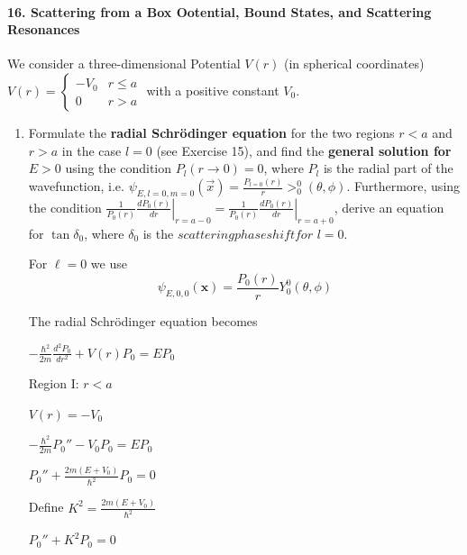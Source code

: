 \documentclass[11pt,a4paper]{scrartcl}
\begin{document}
    \paragraph{16. Scattering from a Box Ootential, Bound States, and Scattering Resonances} We consider a three-dimensional Potential $V(r)$ (in spherical coordinates) 
    $V(r) = \begin{cases}
        -V_0 & r \leq a\\ 0 & r > a
    \end{cases}$
    with a positive constant $V_0$.

    \begin{enumerate}
        \item 
            Formulate the \textbf{radial Schrödinger equation} for the two regions $r < a$ and $r > a$ in the case $l = 0$ (see Exercise 15), and find the \textbf{general solution for} $E > 0$ using the condition $P_l(r \to 0) = 0$, where $P_l$ is the radial part of the wavefunction, i.e. $\psi_{E,l = 0, m = 0}(\vec{x}) = \frac{P_{l = 0}(r)}{r} >_0^0(\theta, \phi)$. Furthermore, using the condition $\left.\frac{1}{P_0(r)} \frac{d P_0(r)}{dr}\right|_{r = a-0} = \left. \frac{1}{P_0(r)} \frac{d P_0 (r)}{dr} \right|_{r=a+0}$, derive an equation for $\tan\delta_0$, where $\delta_0$ is the $scattering phase shift for$ $l=0$.

            \begin{calculationbox}

                For $\ell = 0$ we use
                \[
                \psi_{E,0,0}(\mathbf{x}) = \frac{P_0(r)}{r} Y_0^0(\theta,\phi)
                \]

                The radial Schrödinger equation becomes
                \begin{calculationbox}
                    $-\frac{\hbar^2}{2m}\frac{d^2 P_0}{dr^2} + V(r)P_0 = E P_0$
                \end{calculationbox}

                Region I: $r < a$
                \begin{calculationbox}
                    $V(r) = -V_0$

                    $-\frac{\hbar^2}{2m}P_0'' - V_0 P_0 = E P_0$

                    $P_0'' + \frac{2m(E+V_0)}{\hbar^2} P_0 = 0$

                    Define $K^2 = \frac{2m(E+V_0)}{\hbar^2}$

                    $P_0'' + K^2 P_0 = 0$


\end{calculationbox}
\end{calculationbox}
\end{enumerate}
\end{document}
